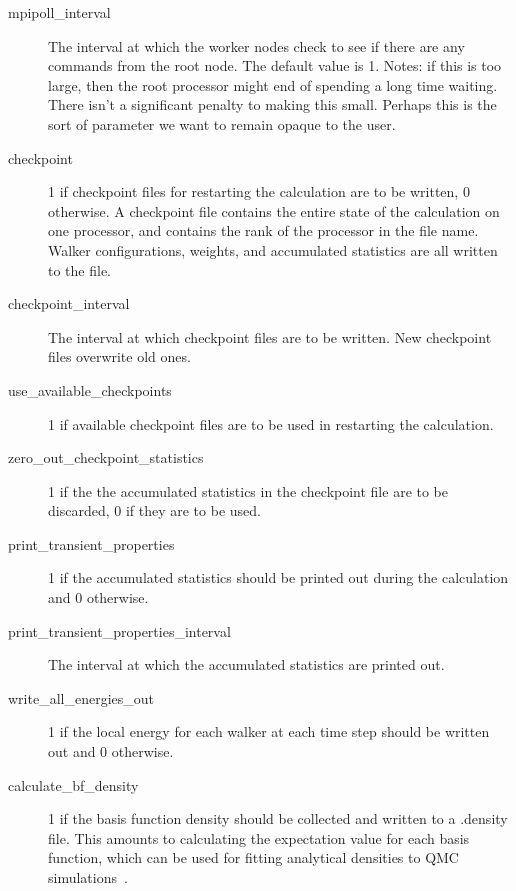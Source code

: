 \documentclass[11pt]{article}
\begin{document}
\begin{description}
\item [mpipoll\_interval] The interval at which the worker nodes
  check to see if there are any commands from the root node.  The
  default value is 1. Notes: if this is too large, then the root processor might                                                                                                          
     end of spending a long time waiting. There isn't                                                                                                                    
     a significant penalty to making this small. Perhaps this                                                                                                            
     is the sort of parameter we want to remain opaque to the user.

\item [checkpoint] 1 if checkpoint files for restarting the calculation
  are to be written, 0 otherwise.  A checkpoint file contains the
  entire state of the calculation on one processor, and contains the
  rank of the processor in the file name.  Walker configurations,
  weights, and accumulated statistics are all written to the file.  

\item [checkpoint\_interval] The interval at which checkpoint files are
  to be written.  New checkpoint files overwrite old ones.  

\item [use\_available\_checkpoints] 1 if available checkpoint files are
  to be used in restarting the calculation.

\item [zero\_out\_checkpoint\_statistics] 1 if the the accumulated
  statistics in the checkpoint file are to be discarded, 0 if they are
  to be used.

\item [print\_transient\_properties] 1 if the accumulated statistics
  should be printed out during the calculation and 0 otherwise.

\item [print\_transient\_properties\_interval] The interval at which the
  accumulated statistics are printed out.

\item [write\_all\_energies\_out] 1 if the local energy for each
  walker at each time step should be written out and 0 otherwise.

\item [calculate\_bf\_density] 1 if the basis function density should be
  collected and written to a .density file.  This amounts to
  calculating the expectation value for each basis function, which can
  be used for fitting analytical densities to QMC
  simulations~\cite{AnalyticalDensity}.


\end{description}
\end{document}
